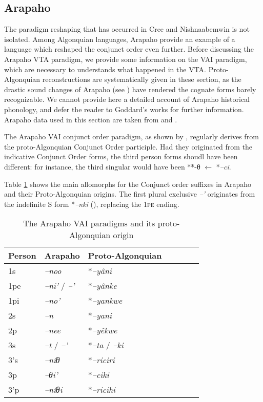 \documentclass[twoside,a4paper,11pt]{article}
\newcommand{\ipa}[1]{{\phon\textit{#1}}}
\newcommand{\grise}[1]{\cellcolor{lightgray}\textbf{#1}}
\newcommand{\Σ}{\greek{Σ}}
\begin{document}
\subsection{Arapaho}

The paradigm reshaping that has occurred in Cree and Nishnaabemwin is not isolated. Among Algonquian languages, Arapaho provide an example of a language which reshaped the conjunct order even further. Before discussing the Arapaho VTA paradigm, we provide some information on the VAI   paradigm, which are necessary to understands what happened in the VTA. Proto-Algonquian reconstructions are systematically given in these section, as the drastic sound changes of Arapaho (see \citealt{goddard74arapaho}) have rendered the cognate forms barely recognizable. We cannot provide here a detailed account of Arapaho historical phonology, and defer the reader to Goddard's works for further information. Arapaho data used in this section are taken from \citet{salzmann67arapaho.verb} and \citet{cowell06arapaho}.

The Arapaho VAI conjunct order paradigm, as shown by \citet[16-7]{goddard65arapaho}, regularly derives from the proto-Algonquian Conjunct Order participle. Had they originated from the indicative Conjunct Order forms, the third person forms shoudl have been different: for instance, the third singular would have been **-θ $\leftarrow$ *\ipa{--ci}.

Table \ref{tab:arapaho.vai} shows the main  allomorphs for the Conjunct order suffixes in Arapaho and their Proto-Algonquian origins. The first plural exclusive \ipa{--'} originates from the indefinite S form *\ipa{--nki} (\citealt{goddard98morphology.arapaho}), replacing the \textsc{1pe} ending.



\begin{table}[H]
\caption{The Arapaho VAI paradigms and its proto-Algonquian origin}
\centering \label{tab:arapaho.vai}
\begin{tabular}{lllllll}
\toprule
Person &   Arapaho    & Proto-Algonquian\\
\midrule
1s & 	\ipa{--noo} &  	*\ipa{--yâni} & 	\\	
1pe & 	\ipa{--ni'} /  	\ipa{--'} \grise{} & 		 *\ipa{--yânke}	 \\	
1pi & 	\ipa{--no'} & 	 		*\ipa{--yankwe} & 	\\	
\midrule
2s & 	\ipa{--n} & 	 	*\ipa{--yani} & 	\\	
2p & 	\ipa{--nee} & 	  		*\ipa{--yêkwe} & 	\\	
\midrule
3s & 	\ipa{--t} /	\ipa{--'} & 		*\ipa{--ta} / \ipa{--ki}& 	\\	
3's & 	\ipa{--níθ} &  		*\ipa{--riciri} & 	\\	
3p & 	\ipa{--θi'} &  		*\ipa{--ciki} 	\\	
3'p & 	\ipa{--níθi} & 	 		*\ipa{--ricihi} 	\\	
\bottomrule
\end{tabular}
\end{table}
\end{document}
